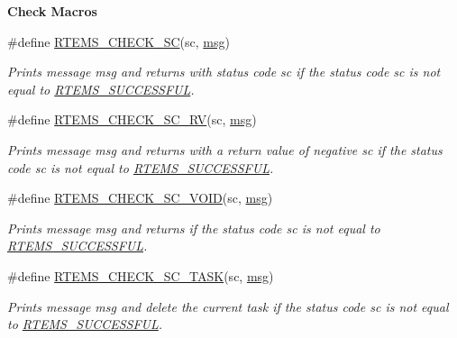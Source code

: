\begin{Indent}\textbf{ Check Macros}\par
\begin{DoxyCompactItemize}
\item 
\#define \mbox{\hyperlink{group__rtems__status__checks_ga91728f4d49188964c0858580daf09650}{R\+T\+E\+M\+S\+\_\+\+C\+H\+E\+C\+K\+\_\+\+SC}}(sc,  \mbox{\hyperlink{structmsg}{msg}})
\begin{DoxyCompactList}\small\item\em Prints message {\itshape msg} and returns with status code {\itshape sc} if the status code {\itshape sc} is not equal to \mbox{\hyperlink{group__ClassicStatus_gga545d41846817eaba6143d52ee4d9e9fea8a23e2d94778f09399da984d73562536}{R\+T\+E\+M\+S\+\_\+\+S\+U\+C\+C\+E\+S\+S\+F\+UL}}. \end{DoxyCompactList}\item 
\#define \mbox{\hyperlink{group__rtems__status__checks_ga35f2f2630337ae4fbd3467a210c64885}{R\+T\+E\+M\+S\+\_\+\+C\+H\+E\+C\+K\+\_\+\+S\+C\+\_\+\+RV}}(sc,  \mbox{\hyperlink{structmsg}{msg}})
\begin{DoxyCompactList}\small\item\em Prints message {\itshape msg} and returns with a return value of negative {\itshape sc} if the status code {\itshape sc} is not equal to \mbox{\hyperlink{group__ClassicStatus_gga545d41846817eaba6143d52ee4d9e9fea8a23e2d94778f09399da984d73562536}{R\+T\+E\+M\+S\+\_\+\+S\+U\+C\+C\+E\+S\+S\+F\+UL}}. \end{DoxyCompactList}\item 
\#define \mbox{\hyperlink{group__rtems__status__checks_ga0ce95e0a68ab52ea6323e1a5ba3bead0}{R\+T\+E\+M\+S\+\_\+\+C\+H\+E\+C\+K\+\_\+\+S\+C\+\_\+\+V\+O\+ID}}(sc,  \mbox{\hyperlink{structmsg}{msg}})
\begin{DoxyCompactList}\small\item\em Prints message {\itshape msg} and returns if the status code {\itshape sc} is not equal to \mbox{\hyperlink{group__ClassicStatus_gga545d41846817eaba6143d52ee4d9e9fea8a23e2d94778f09399da984d73562536}{R\+T\+E\+M\+S\+\_\+\+S\+U\+C\+C\+E\+S\+S\+F\+UL}}. \end{DoxyCompactList}\item 
\#define \mbox{\hyperlink{group__rtems__status__checks_ga344fa496d2064e0435c875e8ee70e346}{R\+T\+E\+M\+S\+\_\+\+C\+H\+E\+C\+K\+\_\+\+S\+C\+\_\+\+T\+A\+SK}}(sc,  \mbox{\hyperlink{structmsg}{msg}})
\begin{DoxyCompactList}\small\item\em Prints message {\itshape msg} and delete the current task if the status code {\itshape sc} is not equal to \mbox{\hyperlink{group__ClassicStatus_gga545d41846817eaba6143d52ee4d9e9fea8a23e2d94778f09399da984d73562536}{R\+T\+E\+M\+S\+\_\+\+S\+U\+C\+C\+E\+S\+S\+F\+UL}}. \end{DoxyCompactList}\item 

\end{DoxyCompactItemize}
\end{Indent}
